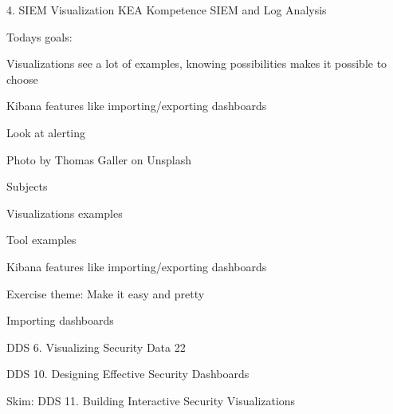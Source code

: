 \documentclass[Screen16to9,17pt]{foils}
\begin{document}
\mytitlepage
{4. SIEM Visualization}
{KEA Kompetence SIEM and Log Analysis}




Todays goals:
\begin{list2}
\item Visualizations see a lot of examples, knowing possibilities makes it possible to choose
\item Kibana features like importing/exporting dashboards
\item Look at alerting
\end{list2}

Photo by Thomas Galler on Unsplash



\begin{list1}
\item Subjects
\begin{list2}
\item Visualizations examples
\item Tool examples
\item Kibana features like importing/exporting dashboards
\end{list2}
\item Exercise theme: Make it easy and pretty
\begin{list2}
\item Importing dashboards
\end{list2}
\end{list1}


\begin{list1}
\item DDS 6. Visualizing Security Data 22
\item DDS 10. Designing Effective Security Dashboards
\item Skim: DDS 11. Building Interactive Security Visualizations
\end{list1}




\end{document}
